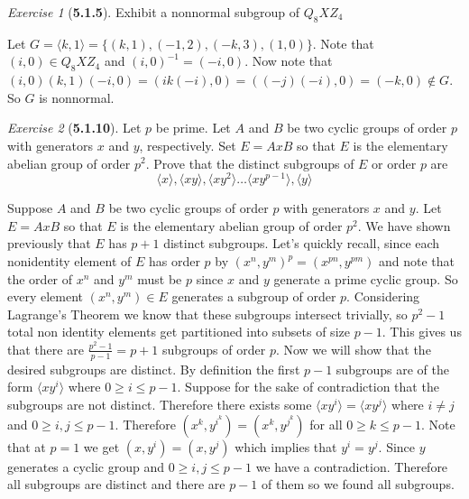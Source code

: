 \documentclass[12pt]{amsart}
\makeatletter
\theoremstyle{remark}
\newtheorem*{exercise}{Exercise}%
\renewenvironment{proof}[1][\proofname]{\par\doublespacing
  \pushQED{\qed}%
  \normalfont \topsep6\p@\@plus6\p@\relax
  \list{}{%
    \settowidth{\leftmargin}{\itshape\proofname:\hskip\labelsep}%
    \setlength{\labelwidth}{0pt}%
    \setlength{\itemindent}{-\leftmargin}%
  }%
  \item[\hskip\labelsep\itshape#1\@addpunct{:}]\ignorespaces
}{%
  \popQED\endlist\@endpefalse
  \singlespacing
}
\theoremstyle{mycomment}
\makeatother
\begin{document}
\begin{exercise}[\textbf{5.1.5}] Exhibit a nonnormal subgroup of $Q_8 X Z_4$
  \begin{proof}[Solution:] Let $G = \langle k, 1\rangle = \{(k, 1), (-1, 2), (-k, 3), (1, 0)\}$. Note that $(i, 0) \in Q_8 X Z_4$ and 
    $(i, 0)^{-1} = (-i, 0)$. Now note that $(i, 0) (k, 1) (-i, 0) = (ik(-i), 0) = ((-j)(-i), 0) = (-k, 0) \not\in G$. So $G$ is nonnormal. 
  \end{proof}
\end{exercise}
\vspace{.15in}



\begin{exercise}[\textbf{5.1.10}] Let $p$ be prime. Let $A$ and $B$ be two cyclic groups of order $p$ with generators $x$ and $y$, 
  respectively. Set $E = AxB$ so that $E$ is the elementary abelian group of order $p^2$. Prove that the distinct subgroups of $E$ or order 
  $p$ are 
  \begin{equation*}
    \langle x \rangle, \langle xy \rangle, \langle xy^2 \rangle\dots\langle xy^{p - 1} \rangle, \langle y \rangle
  \end{equation*}
  \begin{proof} Suppose $A$ and $B$ be two cyclic groups of order $p$ with generators $x$ and $y$. Let $E = AxB$ so that $E$ is the elementary abelian group of order $p^2$.
    We have shown previously that $E$ has $p + 1$ distinct subgroups. Let's quickly recall, since each nonidentity element of $E$ has order $p$ by $(x^n, y^m)^{p} = (x^{pn}, y^{pm})$ and 
    note that the order of $x^n$ and $y^m$ must be $p$ since $x$ and $y$ generate a prime cyclic group. So every element $(x^n, y^m) \in E$ generates a subgroup of order $p$. Considering 
    Lagrange's Theorem we know that these subgroups intersect trivially, so $p^2 - 1$ total non identity elements get partitioned into subsets of size $p - 1$. This gives us that there are 
    $\frac{p^2 - 1}{p - 1} = p+1$ subgroups of order $p$. Now we will show that the desired subgroups are distinct. By definition the first $p - 1$ subgroups are 
    of the form $\langle xy^i\rangle$ where $0 \geq i \leq p - 1$. Suppose for the sake of contradiction that the subgroups are not distinct. Therefore there exists
    some $\langle xy^i \rangle = \langle xy^j \rangle$ where $i \neq j$ and $0 \geq i, j \leq p - 1$. Therefore $(x^k, y^{i^k}) = (x^k, y^{j^k})$ for all $0 \geq k \leq p - 1$. Note that at $p = 1$
    we get $(x, y^{i}) = (x, y^{j})$ which implies that $y^{i} = y^{j}$. Since $y$ generates a cyclic group and $0 \geq i, j \leq p - 1$ we have a contradiction. Therefore all subgroups are distinct and there are 
    $p - 1$ of them so we found all subgroups. 
    \end{proof}
\end{exercise}
\vspace{.15in}
\end{document}
